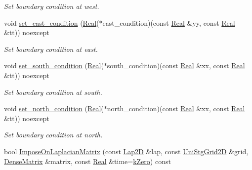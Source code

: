 \begin{DoxyCompactItemize}
\begin{DoxyCompactList}\small\item\em Set boundary condition at west. \end{DoxyCompactList}\item 
void \hyperlink{classmtk_1_1RobinBCDescriptor2D_a94570f6e741bb00038c4bf81842d226c}{set\+\_\+east\+\_\+condition} (\hyperlink{group__c01-roots_gac080bbbf5cbb5502c9f00405f894857d}{Real}($\ast$east\+\_\+condition)(const \hyperlink{group__c01-roots_gac080bbbf5cbb5502c9f00405f894857d}{Real} \&yy, const \hyperlink{group__c01-roots_gac080bbbf5cbb5502c9f00405f894857d}{Real} \&tt)) noexcept
\begin{DoxyCompactList}\small\item\em Set boundary condition at east. \end{DoxyCompactList}\item 
void \hyperlink{classmtk_1_1RobinBCDescriptor2D_a3fbdf58ba24861011fd852f0c642a4c8}{set\+\_\+south\+\_\+condition} (\hyperlink{group__c01-roots_gac080bbbf5cbb5502c9f00405f894857d}{Real}($\ast$south\+\_\+condition)(const \hyperlink{group__c01-roots_gac080bbbf5cbb5502c9f00405f894857d}{Real} \&xx, const \hyperlink{group__c01-roots_gac080bbbf5cbb5502c9f00405f894857d}{Real} \&tt)) noexcept
\begin{DoxyCompactList}\small\item\em Set boundary condition at south. \end{DoxyCompactList}\item 
void \hyperlink{classmtk_1_1RobinBCDescriptor2D_ade17884e6a2636a7c6f989602a0052e0}{set\+\_\+north\+\_\+condition} (\hyperlink{group__c01-roots_gac080bbbf5cbb5502c9f00405f894857d}{Real}($\ast$north\+\_\+condition)(const \hyperlink{group__c01-roots_gac080bbbf5cbb5502c9f00405f894857d}{Real} \&xx, const \hyperlink{group__c01-roots_gac080bbbf5cbb5502c9f00405f894857d}{Real} \&tt)) noexcept
\begin{DoxyCompactList}\small\item\em Set boundary condition at north. \end{DoxyCompactList}\item 
bool \hyperlink{classmtk_1_1RobinBCDescriptor2D_a0a26693f5265fcad978e7ba84e01ed69}{Impose\+On\+Laplacian\+Matrix} (const \hyperlink{classmtk_1_1Lap2D}{Lap2\+D} \&lap, const \hyperlink{classmtk_1_1UniStgGrid2D}{Uni\+Stg\+Grid2\+D} \&grid, \hyperlink{classmtk_1_1DenseMatrix}{Dense\+Matrix} \&matrix, const \hyperlink{group__c01-roots_gac080bbbf5cbb5502c9f00405f894857d}{Real} \&time=\hyperlink{group__c01-roots_ga59a451a5fae30d59649bcda274fea271}{k\+Zero}) const 

\end{DoxyCompactItemize}

